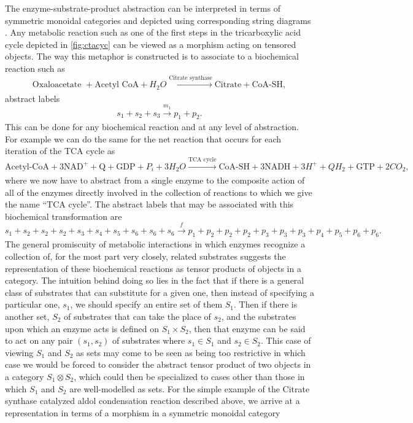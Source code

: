 \documentclass[10pt]{article}
\theoremstyle{plain}
\theoremstyle{definition}
\theoremstyle{remark}
\begin{document}
The enzyme-substrate-product abstraction can be interpreted in terms of symmetric monoidal categories and depicted using corresponding string diagrams \cite{Co2010}. Any metabolic reaction such as one of the first steps in the tricarboxylic acid cycle depicted in \ref{fig:ctacyc} can be viewed as a morphism acting on tensored objects. The way this metaphor is constructed is to associate to a biochemical reaction such as
$$
\text{Oxaloacetate } + \text{Acetyl CoA} + H_2O \xrightarrow[]{\text{Citrate synthase}} \text{Citrate} + \text{CoA-SH},
$$
abstract labels
$$
s_1 + s_2 + s_3 \xrightarrow[]{m_1} p_1 + p_2.
$$
This can be done for any biochemical reaction and at any level of abstraction. For example we can do the same for the net reaction that occurs for each iteration of the TCA cycle as
$$
\text{Acetyl-CoA} + 3 \text{NAD}^+ + \text{Q} + \text{GDP} + P_i + 3 H_2O \xrightarrow[]{\text{TCA cycle}} \text{CoA-SH} + 3 \text{NADH} + 3H^+ + QH_2 + \text{GTP} + 2 CO_2,
$$
where we now have to abstract from a single enzyme to the composite action of all of the enzymes directly involved in the collection of reactions to which we give the name ``TCA cycle''. The abstract labels that may be associated with this biochemical transformation are
$$
s_1 + s_2 + s_2 + s_2 + s_3 + s_4 + s_5 + s_6 + s_6 + s_6 \xrightarrow[]{f} p_1 + p_2 + p_2 + p_2 + p_3 + p_3  + p_3 + p_4 + p_5 + p_6 + p_6.
$$
The general promiscuity of metabolic interactions in which enzymes recognize a collection of, for the most part very closely, related substrates suggests the representation of these biochemical reactions as tensor products of objects in a category. The intuition behind doing so lies in the fact that if there is a general class of substrates that can substitute for a given one, then instead of specifying a particular one, $s_1$, we should specify an entire set of them $S_1$. Then if there is another set, $S_2$ of substrates that can take the place of $s_2$, and the substrates upon which an enzyme acts is defined on $S_1 \times S_2$, then that enzyme can be said to act on any pair $(s_1,s_2)$ of substrates where $s_1 \in S_1$ and $s_2 \in S_2$. This case of viewing $S_1$ and $S_2$ as sets may come to be seen as being too restrictive in which case we would be forced to consider the abstract tensor product of two objects in a category $S_1 \otimes S_2$, which could then be specialized to cases other than those in which $S_1$ and $S_2$ are well-modelled as sets. For the simple example of the Citrate synthase catalyzed aldol condensation reaction described above, we arrive at a representation in terms of a morphism in a symmetric monoidal category
\end{document}
